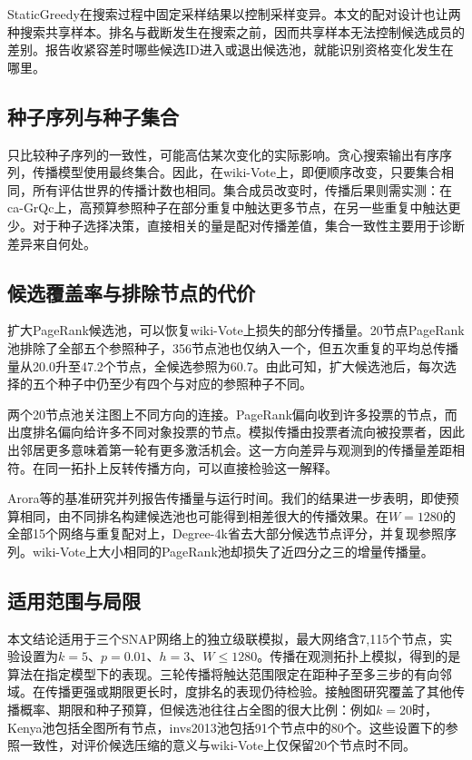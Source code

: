 \documentclass[smallextended]{svjour3}
\begin{document}
StaticGreedy在搜索过程中固定采样结果以控制采样变异\cite{ref8}。本文的配对设计也让两种搜索共享样本。排名与截断发生在搜索之前，因而共享样本无法控制候选成员的差别。报告收紧容差时哪些候选ID进入或退出候选池，就能识别资格变化发生在哪里。

\subsection{种子序列与种子集合}
只比较种子序列的一致性，可能高估某次变化的实际影响。贪心搜索输出有序序列，传播模型使用最终集合。因此，在wiki-Vote上，即便顺序改变，只要集合相同，所有评估世界的传播计数也相同。集合成员改变时，传播后果则需实测：在ca-GrQc上，高预算参照种子在部分重复中触达更多节点，在另一些重复中触达更少。对于种子选择决策，直接相关的量是配对传播差值，集合一致性主要用于诊断差异来自何处。

\subsection{候选覆盖率与排除节点的代价}
扩大PageRank候选池，可以恢复wiki-Vote上损失的部分传播量。20节点PageRank池排除了全部五个参照种子，356节点池也仅纳入一个，但五次重复的平均总传播量从20.0升至47.2个节点，全候选参照为60.7。由此可知，扩大候选池后，每次选择的五个种子中仍至少有四个与对应的参照种子不同。

两个20节点池关注图上不同方向的连接。PageRank偏向收到许多投票的节点，而出度排名偏向给许多不同对象投票的节点。模拟传播由投票者流向被投票者，因此出邻居更多意味着第一轮有更多激活机会。这一方向差异与观测到的传播量差距相符。在同一拓扑上反转传播方向，可以直接检验这一解释。

Arora等的基准研究并列报告传播量与运行时间\cite{ref16}。我们的结果进一步表明，即使预算相同，由不同排名构建候选池也可能得到相差很大的传播效果。在$W=1280$的全部15个网络与重复配对上，Degree-4k省去大部分候选节点评分，并复现参照序列。wiki-Vote上大小相同的PageRank池却损失了近四分之三的增量传播量。

\subsection{适用范围与局限}
本文结论适用于三个SNAP网络上的独立级联模拟，最大网络含7,115个节点，实验设置为$k=5$、$p=0.01$、$h=3$、$W\le1280$。传播在观测拓扑上模拟，得到的是算法在指定模型下的表现。三轮传播将触达范围限定在距种子至多三步的有向邻域。在传播更强或期限更长时，度排名的表现仍待检验。接触图研究覆盖了其他传播概率、期限和种子预算，但候选池往往占全图的很大比例：例如$k=20$时，Kenya池包括全图所有节点，invs2013池包括91个节点中的80个。这些设置下的参照一致性，对评价候选压缩的意义与wiki-Vote上仅保留20个节点时不同。
\end{document}
